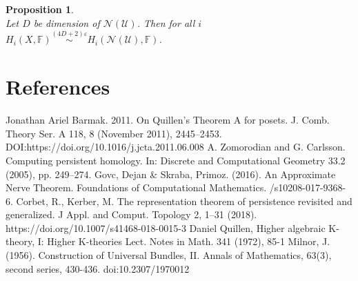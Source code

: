 \documentclass[a4paper, 12pt]{article}
\newtheorem{proposition}{Proposition}
\theoremstyle{definition}
\theoremstyle{remark}
\begin{document}
\begin{proposition} {\cite[Theorem 7.1]{GS16}}\\
  Let $D$ be dimension of $\mathcal{N}(\mathcal{U})$. Then for all $i$ $H_i(X,\mathbb{F}) \stackrel{(4D+2)\varepsilon}{\sim} H_i(\mathcal{N}(\mathcal{U}),\mathbb{F})$.
\end{proposition}

\section{References}

\begin{enumerate}
  Jonathan Ariel Barmak. 2011.
  \newblock On Quillen’s Theorem A for posets.
  \newblock J. Comb. Theory Ser. A 118, 8 (November 2011), 2445–2453.
  \newblock DOI:https://doi.org/10.1016/j.jcta.2011.06.008
  A. Zomorodian and G. Carlsson.
  \newblock Computing persistent homology.
  \newblock In: Discrete and Computational Geometry 33.2 (2005), pp. 249–274.
  Govc, Dejan \& Skraba, Primoz. (2016).
  \newblock An Approximate Nerve Theorem.
  \newblock Foundations of Computational Mathematics.
  /s10208-017-9368-6.
  Corbet, R., Kerber, M.
  \newblock The representation theorem of persistence revisited and generalized.
  \newblock J Appl. and Comput. Topology 2, 1–31 (2018).
  \newblock https://doi.org/10.1007/s41468-018-0015-3
  Daniel Quillen,
  \newblock Higher algebraic K-theory, I: Higher K-theories Lect.
  \newblock Notes in Math. 341 (1972), 85-1
  Milnor, J. (1956).
  \newblock Construction of Universal Bundles, II.
  \newblock Annals of Mathematics, 63(3), second series, 430-436.
  \newblock doi:10.2307/1970012
\end{enumerate}
\end{document}
